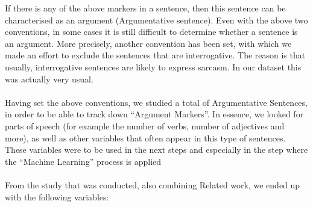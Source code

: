 If there is any of the above markers in a sentence, then this sentence can be characterised as an argument (Argumentative sentence). Even with the above two conventions, in some cases it is still difficult to determine whether a sentence is an argument. More precisely, another convention has been set, with which we made an effort to exclude the sentences that are interrogative. The reason is that usually, interrogative sentences are likely to express sarcasm. In our dataset this was actually very usual.\\
\\
Having set the above conventions, we studied a total of Argumentative Sentences, in order to be able to track down ``Argument Markers''. In essence, we looked for parts of speech (for example the number of verbs, number of adjectives and more), as well as other variables that often appear in this type of sentences. These variables were to be used in the next steps and especially in the step where the ``Machine Learning'' process is applied\\
\\
From the study that was conducted, also combining Related work, we ended up with the following variables:\\
\\
